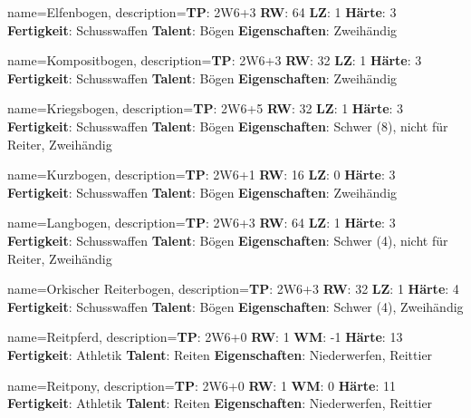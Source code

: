 {
    name={Elfenbogen},
    description={\textbf{TP}: 2W6+3 \textbf{RW}: 64 \textbf{LZ}: 1 \textbf{Härte}: 3        \textbf{Fertigkeit}: Schusswaffen \textbf{Talent}: Bögen \textbf{{Eigenschaften}}: Zweihändig}
}



{
    name={Kompositbogen},
    description={\textbf{TP}: 2W6+3 \textbf{RW}: 32 \textbf{LZ}: 1 \textbf{Härte}: 3        \textbf{Fertigkeit}: Schusswaffen \textbf{Talent}: Bögen \textbf{{Eigenschaften}}: Zweihändig}
}



{
    name={Kriegsbogen},
    description={\textbf{TP}: 2W6+5 \textbf{RW}: 32 \textbf{LZ}: 1 \textbf{Härte}: 3        \textbf{Fertigkeit}: Schusswaffen \textbf{Talent}: Bögen \textbf{{Eigenschaften}}: Schwer (8), nicht für Reiter, Zweihändig}
}



{
    name={Kurzbogen},
    description={\textbf{TP}: 2W6+1 \textbf{RW}: 16 \textbf{LZ}: 0 \textbf{Härte}: 3        \textbf{Fertigkeit}: Schusswaffen \textbf{Talent}: Bögen \textbf{{Eigenschaften}}: Zweihändig}
}



{
    name={Langbogen},
    description={\textbf{TP}: 2W6+3 \textbf{RW}: 64 \textbf{LZ}: 1 \textbf{Härte}: 3        \textbf{Fertigkeit}: Schusswaffen \textbf{Talent}: Bögen \textbf{{Eigenschaften}}: Schwer (4), nicht für Reiter, Zweihändig}
}



{
    name={Orkischer Reiterbogen},
    description={\textbf{TP}: 2W6+3 \textbf{RW}: 32 \textbf{LZ}: 1 \textbf{Härte}: 4        \textbf{Fertigkeit}: Schusswaffen \textbf{Talent}: Bögen \textbf{{Eigenschaften}}: Schwer (4), Zweihändig}
}



{
    name={Reitpferd},
    description={\textbf{TP}: 2W6+0 \textbf{RW}: 1 \textbf{WM}: -1 \textbf{Härte}: 13        \textbf{Fertigkeit}: Athletik \textbf{Talent}: Reiten \textbf{{Eigenschaften}}: Niederwerfen, Reittier}
}



{
    name={Reitpony},
    description={\textbf{TP}: 2W6+0 \textbf{RW}: 1 \textbf{WM}: 0 \textbf{Härte}: 11        \textbf{Fertigkeit}: Athletik \textbf{Talent}: Reiten \textbf{{Eigenschaften}}: Niederwerfen, Reittier}
}



